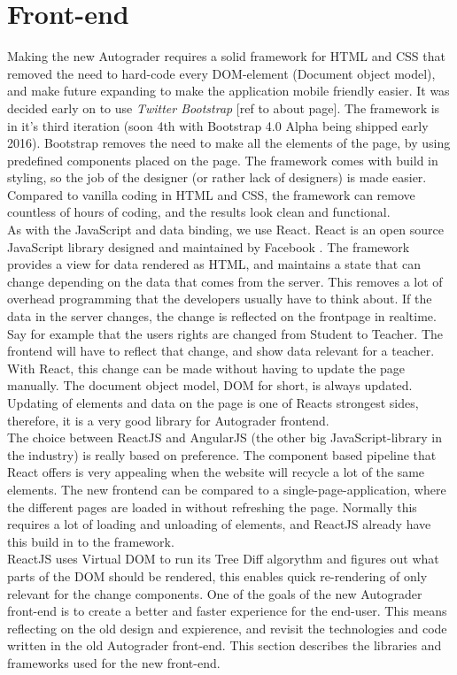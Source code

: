 \section{Front-end}
Making the new Autograder requires a solid framework for HTML and CSS that removed the need to hard-code every DOM-element (Document object model), and make future expanding to make the application mobile friendly easier. It was decided early on to use \textit{Twitter Bootstrap} [ref to about page]. The framework is in it's third iteration (soon 4th with Bootstrap 4.0 Alpha being shipped early 2016). Bootstrap removes the need to make all the elements of the page, by using predefined components placed on the page. The framework comes with build in styling, so the job of the designer (or rather lack of designers) is made easier. Compared to vanilla coding in HTML and CSS, the framework can remove countless of hours of coding, and the results look clean and functional. \\As with the JavaScript and data binding, we use React. React is an open source JavaScript library designed and maintained by Facebook . The framework provides a view for data rendered as HTML, and maintains a state that can change depending on the data that comes from the server. This removes a lot of overhead programming that the developers usually have to think about. If the data in the server changes, the change is reflected on the frontpage in realtime. Say for example that the users rights are changed from Student to Teacher. The frontend will have to reflect that change, and show data relevant for a teacher. With React, this change can be made without having to update the page manually. The document object model, DOM for short, is always updated. Updating of elements and data on the page is one of Reacts strongest sides, therefore, it is a very good library for Autograder frontend. \\The choice between ReactJS and AngularJS (the other big JavaScript-library in the industry) is really based on preference. The component based pipeline that React offers is very appealing when the website will recycle a lot of the same elements. The new frontend can be compared to a single-page-application, where the different pages are loaded in without refreshing the page. Normally this requires a lot of loading and unloading of elements, and ReactJS already have this build in to the framework. \\ReactJS uses Virtual DOM to run its Tree Diff algorythm and figures out what parts of the DOM should be rendered, this enables quick re-rendering of only relevant for the change components.
One of the goals of the new Autograder front-end is to create a better and faster experience for the end-user. This means reflecting on the old design and expierence, and revisit the technologies and code written in the old Autograder front-end. This section describes the libraries and frameworks used for the new front-end.

